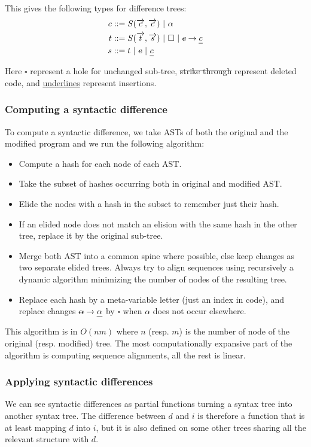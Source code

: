 \documentclass[a4paper,11pt]{article}
\newcommand\typsep{\ |\ }
\newcommand\mathst[1]{\text{\st{$#1$}}}
\newcommand\mathul[1]{\text{\ul{$#1$}}}
\newcommand\id{\square}
\newcommand\change[2]{\mathst{#1} \rightarrow \mathul{#2}}
\begin{document}
This gives the following types for difference trees:
\begin{align*}
c &::= S(\overrightarrow{c}, \overrightarrow{c}) \typsep \alpha\\
t &::= S(\overrightarrow{t}, \overrightarrow{s}) \typsep \id \typsep \change{c}{c}\\
s &::= t \typsep \mathst{c} \typsep \mathul{c}\\
\end{align*}

Here $\id$ represent a hole for unchanged sub-tree, \st{strike through} represent deleted code, and \ul{underlines} represent insertions.

\subsubsection{Computing a syntactic difference}
To compute a syntactic difference, we take ASTs of both the original and the modified program and we run the following algorithm:
\begin{itemize}
  \item Compute a hash for each node of each AST.
  \item Take the subset of hashes occurring both in original and modified AST.
  \item Elide the nodes with a hash in the subset to remember just their hash.
  \item If an elided node does not match an elision with the same hash in the other tree, replace it by the original sub-tree.
  \item Merge both AST into a common spine where possible, else keep changes as two separate elided trees. Always try to align sequences using recursively a dynamic algorithm minimizing the number of nodes of the resulting tree.
  \item Replace each hash by a meta-variable letter (just an index in code), and replace changes $\change{\alpha}{\alpha}$ by $\id$ when $\alpha$ does not occur elsewhere.
\end{itemize}

This algorithm is in $O(nm)$ where $n$ (resp. $m$) is the number of node of the original (resp. modified) tree. The most computationally expansive part of the algorithm is computing sequence alignments, all the rest is linear.

\subsubsection{Applying syntactic differences}
We can see syntactic differences as partial functions turning a syntax tree into another syntax tree.
The difference between $d$ and $i$ is therefore a function that is at least mapping $d$ into $i$, but it is also defined on some other trees sharing all the relevant structure with $d$.
\end{document}
